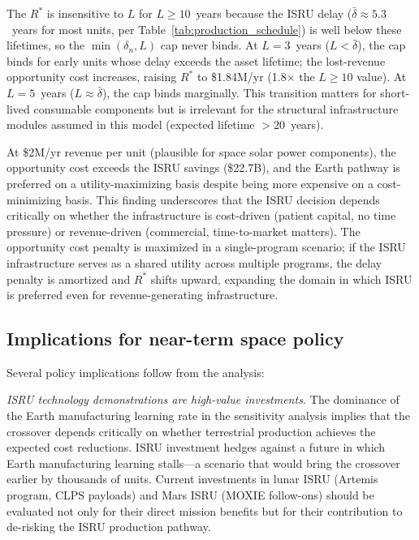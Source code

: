 \documentclass[preprint,12pt]{elsarticle}
\begin{document}
The $R^*$ is insensitive to $L$ for $L \geq 10$~years because the ISRU delay ($\bar{\delta} \approx 5.3$~years for most units, per Table~\ref{tab:production_schedule}) is well below these lifetimes, so the $\min(\delta_n, L)$ cap never binds. At $L = 3$~years ($L < \bar{\delta}$), the cap binds for early units whose delay exceeds the asset lifetime; the lost-revenue opportunity cost increases, raising $R^*$ to \$1.84M/yr (1.8$\times$ the $L \geq 10$ value). At $L = 5$~years ($L \approx \bar{\delta}$), the cap binds marginally. This transition matters for short-lived consumable components but is irrelevant for the structural infrastructure modules assumed in this model (expected lifetime $>$20~years).

At \$2M/yr revenue per unit (plausible for space solar power components), the opportunity cost exceeds the ISRU savings (\$22.7B), and the Earth pathway is preferred on a utility-maximizing basis despite being more expensive on a cost-minimizing basis. This finding underscores that the ISRU decision depends critically on whether the infrastructure is cost-driven (patient capital, no time pressure) or revenue-driven (commercial, time-to-market matters). The opportunity cost penalty is maximized in a single-program scenario; if the ISRU infrastructure serves as a shared utility across multiple programs, the delay penalty is amortized and $R^*$ shifts upward, expanding the domain in which ISRU is preferred even for revenue-generating infrastructure.

\subsection{Implications for near-term space policy}

Several policy implications follow from the analysis:

\emph{ISRU technology demonstrations are high-value investments.} The dominance of the Earth manufacturing learning rate in the sensitivity analysis implies that the crossover depends critically on whether terrestrial production achieves the expected cost reductions. ISRU investment hedges against a future in which Earth manufacturing learning stalls---a scenario that would bring the crossover earlier by thousands of units. Current investments in lunar ISRU (Artemis program, CLPS payloads) and Mars ISRU (MOXIE follow-ons) should be evaluated not only for their direct mission benefits but for their contribution to de-risking the ISRU production pathway.
\end{document}

